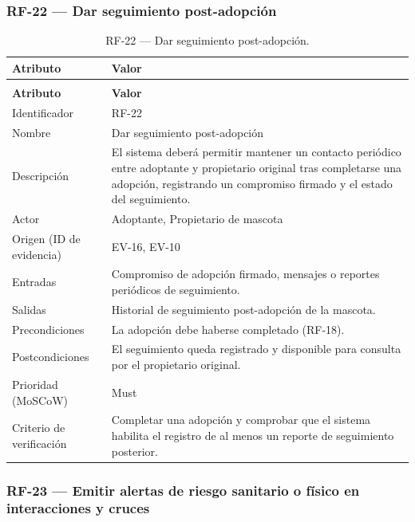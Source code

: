 \documentclass[journal,onecolumn]{IEEEtran}
\makeatletter
\newenvironment{atributos}[2]{%
	\small
	\begin{longtable}{@{}>{\raggedright\arraybackslash}p{4.2cm} >{\raggedright\arraybackslash}p{11.2cm}@{}}
		\caption{#2}\label{tab:#1}\\
		\toprule
		\textbf{Atributo} & \textbf{Valor} \\
		\midrule
		\endfirsthead
		\multicolumn{2}{@{}l}{\small\itshape (continuación)}\\
		\toprule
		\textbf{Atributo} & \textbf{Valor} \\
		\midrule
		\endhead
		\bottomrule
		\endlastfoot
	}{%
	\end{longtable}
	\normalsize
}
\makeatother
\begin{document}
	\subsubsection{RF-22 --- Dar seguimiento post-adopción}
	
	\begin{atributos}{RF-22}{RF-22 --- Dar seguimiento post-adopción.}
		Identificador & RF-22 \\
		Nombre & Dar seguimiento post-adopción \\
		Descripción & El sistema deberá permitir mantener un contacto periódico entre adoptante y propietario original tras completarse una adopción, registrando un compromiso firmado y el estado del seguimiento. \\
		Actor & Adoptante, Propietario de mascota \\
		Origen (ID de evidencia) & EV-16, EV-10 \\
		Entradas & Compromiso de adopción firmado, mensajes o reportes periódicos de seguimiento. \\
		Salidas & Historial de seguimiento post-adopción de la mascota. \\
		Precondiciones & La adopción debe haberse completado (RF-18). \\
		Postcondiciones & El seguimiento queda registrado y disponible para consulta por el propietario original. \\
		Prioridad (MoSCoW) & Must \\
		Criterio de verificación & Completar una adopción y comprobar que el sistema habilita el registro de al menos un reporte de seguimiento posterior. \\
	\end{atributos}
	
	\subsubsection{RF-23 --- Emitir alertas de riesgo sanitario o físico en interacciones y cruces}
	
\end{document}

